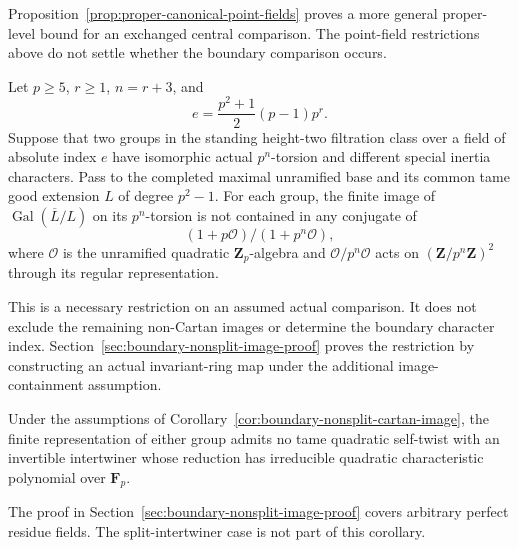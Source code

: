 Proposition~\ref{prop:proper-canonical-point-fields} proves a
more general proper-level bound for an exchanged central
comparison. The point-field restrictions above do not settle
whether the boundary comparison occurs.

\begin{corollary}
\label{cor:boundary-nonsplit-cartan-image}
Let $p\ge5$, $r\ge1$, $n=r+3$, and
\[
                    e=\frac{p^2+1}{2}(p-1)p^r.
\]
Suppose that two groups in the standing height-two filtration class
over a field of absolute index $e$ have isomorphic actual
$p^n$-torsion and different special inertia characters.
Pass to the completed maximal unramified base and its common
tame good extension $L$ of degree $p^2-1$.
For each group, the finite image of
$\operatorname{Gal}(\overline L/L)$ on its $p^n$-torsion is not
contained in any conjugate of
\[
                    (1+p\mathcal O)/(1+p^n\mathcal O),
\]
where $\mathcal O$ is the unramified quadratic
$\mathbf Z_p$-algebra and $\mathcal O/p^n\mathcal O$ acts on
$(\mathbf Z/p^n\mathbf Z)^2$ through its regular representation.
\end{corollary}

This is a necessary restriction on an assumed actual comparison.
It does not exclude the remaining non-Cartan images or determine
the boundary character index. Section~\ref{sec:boundary-nonsplit-image-proof}
proves the restriction by constructing an actual invariant-ring map
under the additional image-containment assumption.

\begin{corollary}
\label{cor:boundary-nonsplit-self-twist}
Under the assumptions of
Corollary~\ref{cor:boundary-nonsplit-cartan-image}, the finite
representation of either group admits no tame quadratic self-twist
with an invertible intertwiner whose reduction has irreducible
quadratic characteristic polynomial over $\mathbf F_p$.
\end{corollary}


The proof in Section~\ref{sec:boundary-nonsplit-image-proof} covers
arbitrary perfect residue fields. The split-intertwiner case is not
part of this corollary.
